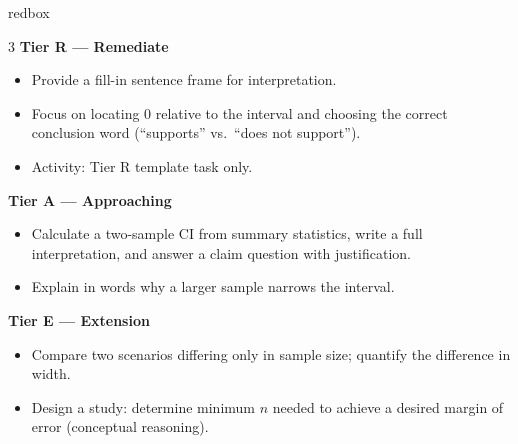 \documentclass[10pt]{article}
\begin{document}
\begin{skillbox}{redbox}
\begin{multicols}{3}
    \textbf{Tier R --- Remediate}
    \begin{itemize}
        \item Provide a fill-in sentence frame for interpretation.
        \item Focus on locating 0 relative to the interval and choosing the correct
              conclusion word (``supports'' vs.\ ``does not support'').
        \item Activity: Tier R template task only.
    \end{itemize}
    \columnbreak
    \textbf{Tier A --- Approaching}
    \begin{itemize}
        \item Calculate a two-sample CI from summary statistics, write a full
              interpretation, and answer a claim question with justification.
        \item Explain in words why a larger sample narrows the interval.
    \end{itemize}
    \columnbreak
    \textbf{Tier E --- Extension}
    \begin{itemize}
        \item Compare two scenarios differing only in sample size; quantify the
              difference in width.
        \item Design a study: determine minimum $n$ needed to achieve a desired
              margin of error (conceptual reasoning).
    \end{itemize}
\end{multicols}
\end{skillbox}
\end{document}
